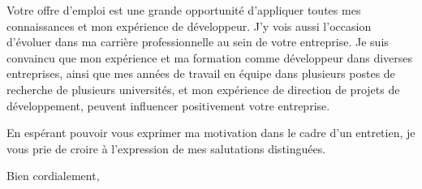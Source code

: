 \documentclass[11pt,a4paper]{letter} %
\newcommand{\resume}{Votre offre d'emploi est une grande opportunité d'appliquer toutes mes connaissances et mon expérience de développeur. J'y vois aussi l'occasion d'évoluer dans ma carrière professionnelle au sein de votre entreprise. Je suis convaincu que mon expérience et ma formation comme développeur dans diverses entreprises, ainsi que mes années de travail en équipe dans plusieurs postes de recherche de plusieurs universités, et mon expérience de direction de projets de développement, peuvent influencer positivement votre entreprise.}
\begin{document}
\begin{letter}

\resume{} 


En espérant pouvoir vous exprimer ma motivation dans le cadre d'un entretien, je vous prie de croire %
à l'expression de mes salutations distinguées.

\closing{Bien cordialement,}


\end{letter}
\end{document}
